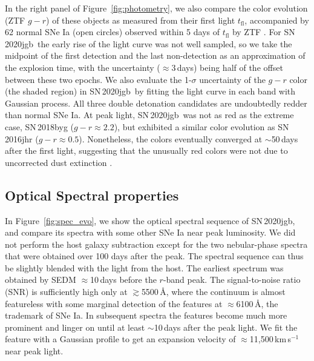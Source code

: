 \documentclass[twocolumn]{aastex631}
\newcommand{\sn}{SN\,2020jgb}
\begin{document}
In the right panel of Figure~\ref{fig:photometry}, we also compare the color evolution (ZTF $g-r$) of these objects as measured from their first light $t_\mathrm{fl}$, accompanied by 62 normal SNe Ia (open circles) observed within 5 days of $t_\mathrm{fl}$ by ZTF \citep[from][]{Bulla2020}. For \sn\, the early rise of the light curve was not well sampled, so we take the midpoint of the first detection and the last non-detection as an approximation of the explosion time, with the uncertainty ($\approx$3\,days) being half of the offset between these two epochs. We also evaluate the 1-$\sigma$ uncertainty of the $g-r$ color (the shaded region) in \sn\ by fitting the light curve in each band with Gaussian process. All three double detonation candidates are undoubtedly redder than normal SNe Ia. At peak light, \sn\ was not as red as the extreme case, SN\,2018byg ($g-r\approx2.2$), but exhibited a similar color evolution as SN\,2016jhr ($g-r\approx0.5$). Nonetheless, the colors eventually converged at $\sim$50\,days after the first light, suggesting that the unusually red colors were not due to uncorrected dust extinction \citep{de_18byg_2019}.

\subsection{Optical Spectral properties}
In Figure~\ref{fig:spec_evo}, we show the optical spectral sequence of \sn, and compare its spectra with some other SNe Ia near peak luminosity. We did not perform the host galaxy subtraction except for the two nebular-phase spectra that were obtained over 100 days after the peak. The spectral sequence can thus be slightly blended with the light from the host. The earliest spectrum was obtained by SEDM $\approx$10\,days before the $r$-band peak. The signal-to-noise ratio (SNR) is sufficiently high only at $\gtrsim$5500\,\r{A}, where the continuum is almost featureless with some marginal detection of the  features at $\approx$6100\,\r{A}, the trademark of SNe Ia. In subsequent spectra the  features become much more prominent and linger on until at least $\sim$10\,days after the peak light. We fit the  feature with a Gaussian profile to get an expansion velocity of $\approx$11,500\,km\,s$^{-1}$ near peak light. 
\end{document}
